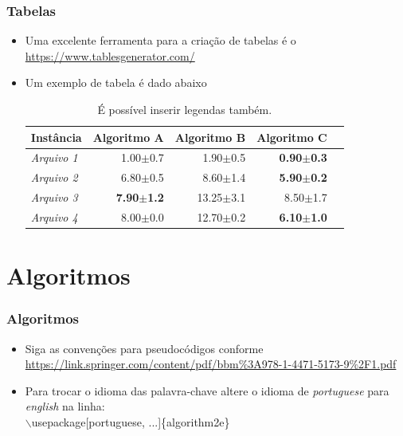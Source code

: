 \documentclass[mathsans,times]{beamer}
\begin{document}
\begin{frame}
	\frametitle{Tabelas}
	\begin{itemize}
		\item Uma excelente ferramenta para a criação de tabelas é o \url{https://www.tablesgenerator.com/}
		\vspace{3mm}
		\item Um exemplo de tabela é dado abaixo
		\vspace{5mm}
		\begin{table}[htb]
			\centering
			\caption{É possível inserir legendas também.}
			\label{tab:resultados}
			\begin{tabular}{lrrrr}
				\hline
				Instância       &    Algoritmo A &     Algoritmo B &    Algoritmo C \\\hline
				\textit{Arquivo 1}  &  1.00$\pm$0.7  &    1.90$\pm$0.5 &   \textbf{0.90$\pm$0.3} \\
				\textit{Arquivo 2}  &  6.80$\pm$0.5  &    8.60$\pm$1.4 &   \textbf{5.90$\pm$0.2} \\
				\textit{Arquivo 3}  &  \textbf{7.90$\pm$1.2}  &   13.25$\pm$3.1 &   8.50$\pm$1.7 \\
				\textit{Arquivo 4}  &  8.00$\pm$0.0  &   12.70$\pm$0.2 &  \textbf{6.10$\pm$1.0} \\\hline
			\end{tabular}
		\end{table}
	\end{itemize}
\end{frame}

\section{Algoritmos}

\begin{frame}
	\frametitle{Algoritmos}
	\begin{itemize}
		\item Siga as convenções para pseudocódigos conforme \url{https://link.springer.com/content/pdf/bbm\%3A978-1-4471-5173-9\%2F1.pdf}
		\vspace{3mm}
		\item Para trocar o idioma das palavra-chave altere o idioma de \textit{portuguese} para \textit{english} na linha:\\
		$\backslash$usepackage[portuguese, ...]\{algorithm2e\}
	\end{itemize}
\end{frame}
\end{document}

